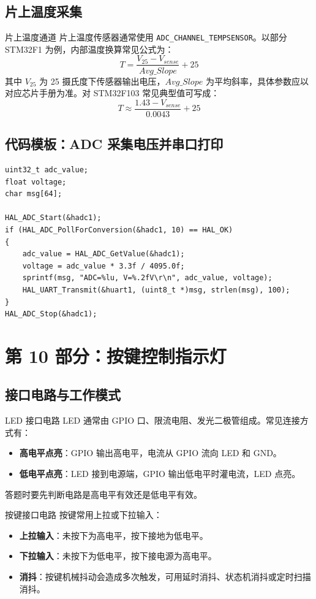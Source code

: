\documentclass[UTF8,fontset=none,12pt]{ctexart}
\newcommand{\api}[1]{{\footnotesize\nolinkurl{#1}}}
\begin{document}
\subsection{片上温度采集}
\begin{pointbox}{片上温度通道}
片上温度传感器通常使用 \api{ADC_CHANNEL_TEMPSENSOR}。以部分 STM32F1 为例，内部温度换算常见公式为：
\[
  T=\frac{V_{25}-V_{sense}}{Avg\_Slope}+25
\]
其中 $V_{25}$ 为 25 摄氏度下传感器输出电压，$Avg\_Slope$ 为平均斜率，具体参数应以对应芯片手册为准。对 STM32F103 常见典型值可写成：
\[
  T\approx \frac{1.43 - V_{sense}}{0.0043}+25
\]
\end{pointbox}

\subsection{代码模板：ADC 采集电压并串口打印}
\begin{lstlisting}[style=cstyle]
uint32_t adc_value;
float voltage;
char msg[64];

HAL_ADC_Start(&hadc1);
if (HAL_ADC_PollForConversion(&hadc1, 10) == HAL_OK)
{
    adc_value = HAL_ADC_GetValue(&hadc1);
    voltage = adc_value * 3.3f / 4095.0f;
    sprintf(msg, "ADC=%lu, V=%.2fV\r\n", adc_value, voltage);
    HAL_UART_Transmit(&huart1, (uint8_t *)msg, strlen(msg), 100);
}
HAL_ADC_Stop(&hadc1);
\end{lstlisting}

\section{第 10 部分：按键控制指示灯}

\subsection{接口电路与工作模式}
\begin{pointbox}{LED 接口电路}
LED 通常由 GPIO 口、限流电阻、发光二极管组成。常见连接方式有：
\begin{itemize}
  \item \textbf{高电平点亮}：GPIO 输出高电平，电流从 GPIO 流向 LED 和 GND。
  \item \textbf{低电平点亮}：LED 接到电源端，GPIO 输出低电平时灌电流，LED 点亮。
\end{itemize}
答题时要先判断电路是高电平有效还是低电平有效。
\end{pointbox}

\begin{pointbox}{按键接口电路}
按键常用上拉或下拉输入：
\begin{itemize}
  \item \textbf{上拉输入}：未按下为高电平，按下接地为低电平。
  \item \textbf{下拉输入}：未按下为低电平，按下接电源为高电平。
  \item \textbf{消抖}：按键机械抖动会造成多次触发，可用延时消抖、状态机消抖或定时扫描消抖。
\end{itemize}
\end{pointbox}
\end{document}
